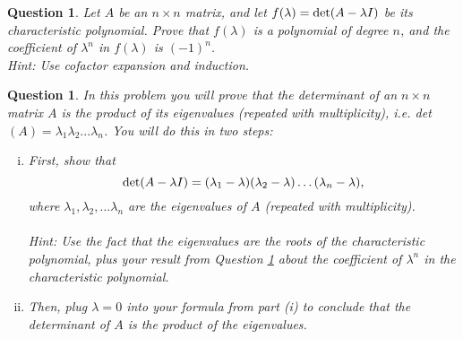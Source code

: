 \documentclass[12pt]{article}
\newtheorem{question}[thm]{Question}
\begin{document}
\begin{question}\label{degree}	\normalfont
Let $A$ be an $n\times n$ matrix, and let $f(\lambda) = \textup{det}(A - \lambda I)$ be its characteristic polynomial. Prove that $f(\lambda)$ is a polynomial of degree $n$, and the coefficient of $\lambda^n$ in $f(\lambda)$ is $(-1)^n$. \\
\emph{Hint: Use cofactor expansion and induction.}	
\end{question}
	


\vspace{1cm}

\begin{question}
\normalfont In this problem you will prove that the determinant of an $n\times n$ matrix $A$ is the product of its eigenvalues (repeated with multiplicity), i.e. det$(A) =\lambda_1\lambda_2...\lambda_n$. You will do this in two steps:
\begin{enumerate}[(i)]
\item First, show that 
\[
\textup{det}(A-\lambda I) = (\lambda_1 - \lambda)(\lambda_2 - \lambda) \ldots (\lambda_n-\lambda),
\]
where $\lambda_1, \lambda_2,...\lambda_n$ are the eigenvalues of $A$ (repeated with multiplicity). \\ \\
\emph{Hint: Use the fact that the eigenvalues are the roots of the characteristic polynomial, plus your result from Question \ref{degree} about the coefficient of $\lambda^n$ in the characteristic polynomial.}

\item Then, plug $\lambda=0$ into your formula from part (i) to conclude that the determinant of $A$ is the product of the eigenvalues. 
\end{enumerate}



\end{question}




\vspace{1cm}


	
	\vspace{.5cm}
	
\end{document}
